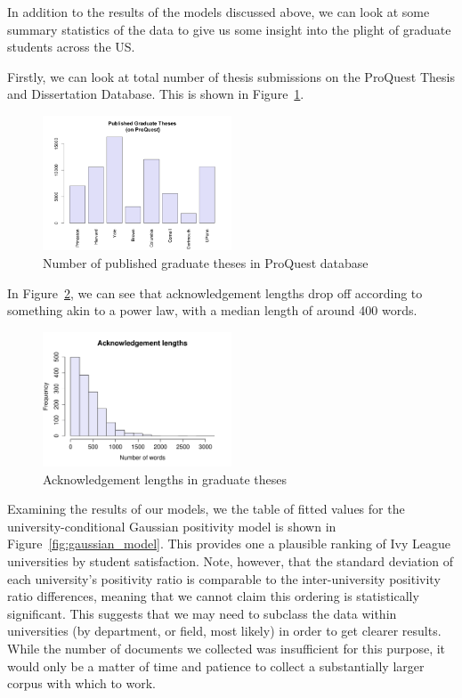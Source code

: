 In addition to the results of the models discussed above, we can look at some summary statistics of the data to give us some insight into the plight of graduate students across the US.

Firstly, we can look at total number of thesis submissions on the ProQuest Thesis and Dissertation Database. This is shown in Figure~\ref{fig:pub_theses}.

\begin{figure}[H]
  \centering
  \includegraphics[width=0.5\textwidth]{img/pub_theses.png}
  \caption{Number of published graduate theses in ProQuest database}
  \label{fig:pub_theses}
\end{figure}

In Figure~\ref{fig:ack_lengths}, we can see that acknowledgement lengths drop off according to something akin to a power law, with a median length of around 400 words.

\begin{figure}[H]
  \centering
  \includegraphics[width=0.5\textwidth]{img/ack_lengths.pdf}
  \caption{Acknowledgement lengths in graduate theses}
  \label{fig:ack_lengths}
\end{figure}

Examining the results of our models, we the table of fitted values for the university-conditional Gaussian positivity model is shown in Figure~\ref{fig:gaussian_model}. This provides one a plausible ranking of Ivy League universities by student satisfaction. Note, however, that the standard deviation of each university's positivity ratio is comparable to the inter-university positivity ratio differences, meaning that we cannot claim this ordering is statistically significant. This suggests that we may need to subclass the data within universities (by department, or field, most likely) in order to get clearer results. While the number of documents we collected was insufficient for this purpose, it would only be a matter of time and patience to collect a substantially larger corpus with which to work.

